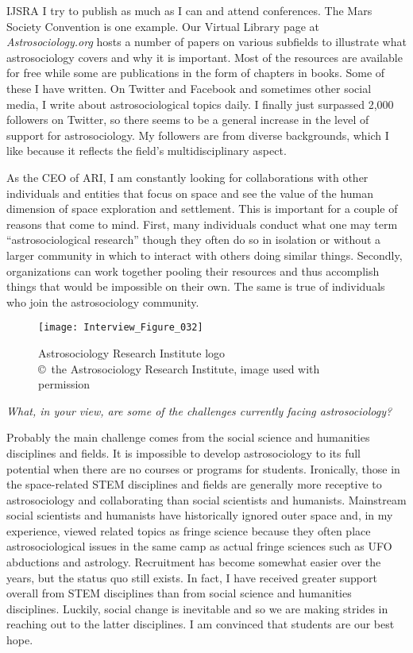 \begin{labeling}{IJSRA}
	I try to publish as much as I can and attend conferences. The Mars Society Convention is one example. Our Virtual Library page at \emph{Astrosociology.org} hosts a number of papers on various subfields to illustrate what astrosociology covers and why it is important. Most of the resources are available for free while some are publications in the form of chapters in books. Some of these I have written. On Twitter and Facebook and sometimes other social media, I write about astrosociological topics daily. I finally just surpassed 2,000 followers on Twitter, so there seems to be a general increase in the level of support for astrosociology. My followers are from diverse backgrounds, which I like because it reflects the field’s multidisciplinary aspect.

	As the CEO of ARI, I am constantly looking for collaborations with other individuals and entities that focus on space and see the value of the human dimension of space exploration and settlement. This is important for a couple of reasons that come to mind. First, many individuals conduct what one may term “astrosociological research” though they often do so in isolation or without a larger community in which to interact with others doing similar things. Secondly, organizations can work together pooling their resources and thus accomplish things that would be impossible on their own. The same is true of individuals who join the astrosociology community.

	\begin{figure}[!htb]
		\texttt{[image: Interview\_Figure\_032]}
		\centering
		\caption{Astrosociology Research Institute logo
			{\normalfont\scriptsize \\ \copyright\ the Astrosociology Research Institute, image used with permission
		}}
		\label{Interview_Figure_032}
	\end{figure}

	\item[IJSRA] \emph{What, in your view, are some of the challenges currently facing astrosociology?}

	\item[JP] Probably the main challenge comes from the social science and humanities disciplines and fields. It is impossible to develop astrosociology to its full potential when there are no courses or programs for students. Ironically, those in the space-related STEM disciplines and fields are generally more receptive to astrosociology and collaborating than social scientists and humanists. Mainstream social scientists and humanists have historically ignored outer space and, in my experience, viewed related topics as fringe science because they often place astrosociological issues in the same camp as actual fringe sciences such as UFO abductions and astrology. Recruitment has become somewhat easier over the years, but the status quo still exists. In fact, I have received greater support overall from STEM disciplines than from social science and humanities disciplines. Luckily, social change is inevitable and so we are making strides in reaching out to the latter disciplines. I am convinced that students are our best hope.


\end{labeling}
